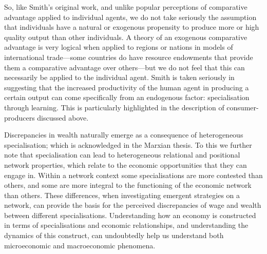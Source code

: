 So, like Smith's original work, and unlike popular perceptions of comparative advantage applied to individual agents, we do not take seriously the assumption that individuals have a natural or exogenous propensity to produce more or high quality output than other individuals. A theory of an exogenous comparative advantage is very logical when applied to regions or nations in models of international trade---some countries do have resource endowments that provide them a comparative advantage over others---but we do not feel that this can necessarily be applied to the individual agent. Smith is taken seriously in suggesting that the increased productivity of the human agent in producing a certain output can come specifically from an endogenous factor: specialisation through learning. This is particularly highlighted in the description of consumer-producers discussed above. 

Discrepancies in wealth naturally emerge as a consequence of heterogeneous specialisation; which is acknowledged in the Marxian thesis. To this we further note that specialisation can lead to heterogeneous relational and positional network properties, which relate to the economic opportunities that they can engage in. Within a network context some specialisations are more contested than others, and some are more integral to the functioning of the economic network than others. These differences, when investigating emergent strategies on a network, can provide the basis for the perceived discrepancies of wage and wealth between different specialisations. Understanding how an economy is constructed in terms of specialisations and economic relationships, and understanding the dynamics of this construct, can undoubtedly help us understand both microeconomic and macroeconomic phenomena.


